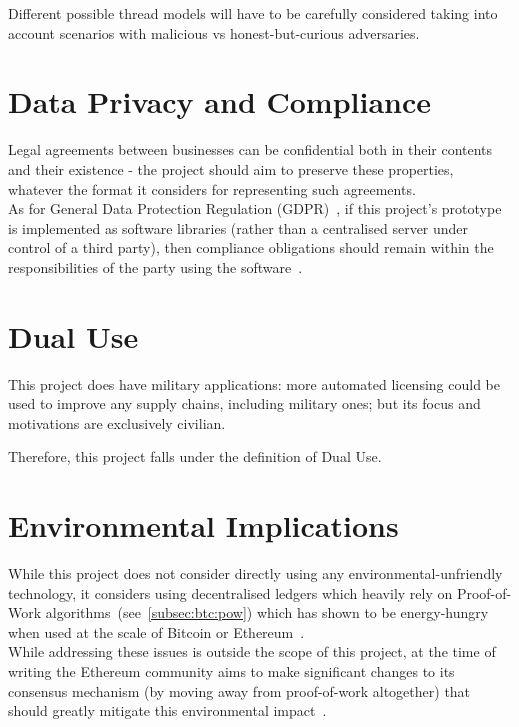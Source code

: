 Different possible thread models will have to be carefully considered taking into account scenarios
with malicious vs honest-but-curious adversaries.


\section{Data Privacy and Compliance}\label{sec:data-privacy-compliance}


Legal agreements between businesses can be confidential both in their contents and their existence -
the project should aim to preserve these properties, whatever the format it considers for
representing such agreements.\\

As for General Data Protection Regulation (GDPR)~\cite{gdprInfo}, if this project's prototype is
implemented as software libraries (rather than a centralised server under control of a third party),
then compliance obligations should remain within the responsibilities of the party using the
software~\citeTODO.

\section{Dual Use}\label{sec:dual-use}

This project does have military applications: more automated licensing could be used to improve
any supply chains, including military ones;
but its focus and motivations are exclusively civilian.

Therefore, this project falls under the definition of Dual Use.

\section{Environmental Implications}\label{sec:environmental-implications}

While this project does not consider directly using any environmental-unfriendly technology, it
considers using decentralised ledgers which heavily rely on Proof-of-Work
algorithms~(see~\ref{subsec:btc:pow}) which has shown to be energy-hungry when used at the scale of
Bitcoin or Ethereum~\cite{GOODKIND2020101281}.\\

While addressing these issues is outside the scope of this project, at the time of writing the
Ethereum community aims to make significant changes to its consensus mechanism (by moving away from
proof-of-work altogether) that should greatly mitigate this environmental impact~\cite{eth2Vision}.

